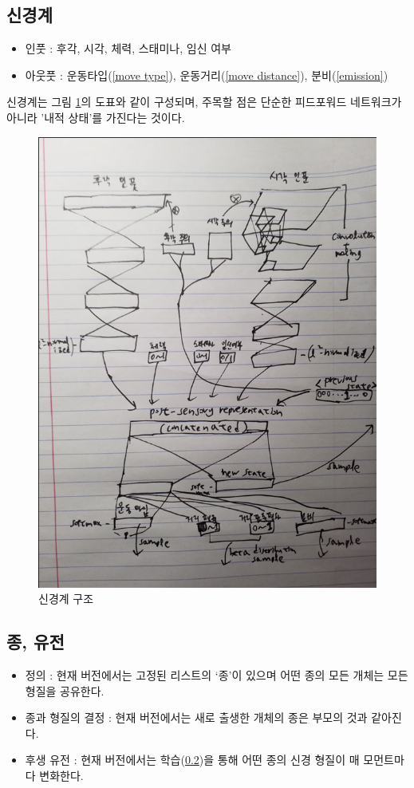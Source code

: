 \documentclass[a4paper,12pt]{article}
\begin{document}
\subsection{신경계}\label{brain}
\begin{itemize}
\item 인풋 : 후각, 시각, 체력, 스태미나, 임신 여부  
\item 아웃풋 : 운동타입(\ref{move type}), 운동거리(\ref{move distance}), 분비(\ref{emission})
\end{itemize}
신경계는 그림 \ref{figure:nn}의 도표와 같이 구성되며, 주목할 점은 단순한 피드포워드 네트워크가 아니라 '내적 상태'를 가진다는 것이다.
\begin{figure}[h]
	\centering
	\includegraphics[scale=0.6]{minion_nn.png}
	\caption{신경계 구조}
	\label{figure:nn}
\end{figure} 

\subsection{종, 유전}\label{heredity}
\begin{itemize} 
\item 정의 : 현재 버전에서는 고정된 리스트의 ‘종’이 있으며 어떤 종의 모든 개체는 모든 형질을 공유한다. 
\item 종과 형질의 결정 : 현재 버전에서는 새로 출생한 개체의 종은 부모의 것과 같아진다. 
\item 후생 유전 : 현재 버전에서는 학습(\ref{heredity})을 통해 어떤 종의 신경 형질이 매 모먼트마다 변화한다.
\end{itemize} 
\end{document}
